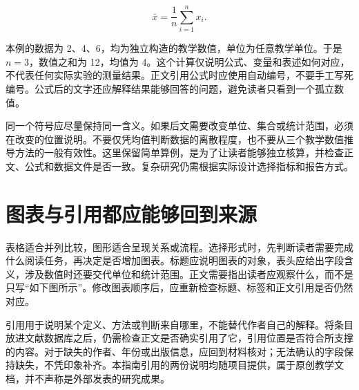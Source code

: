 \begin{equation}
\bar{x}=\frac{1}{n}\sum_{i=1}^{n}x_i.
\label{eq:mean}
\end{equation}

本例的数据为 2、4、6，均为独立构造的教学数值，单位为任意教学单位。于是 $n=3$，数值之和为 12，均值为 4。这个计算仅说明公式、变量和表述如何对应，不代表任何实际实验的测量结果。正文引用公式时应使用自动编号，不要手工写死编号。公式后的文字还应解释结果能够回答的问题，避免读者只看到一个孤立数值。

同一个符号应尽量保持同一含义。如果后文需要改变单位、集合或统计范围，必须在改变的位置说明。不要仅凭均值判断数据的离散程度，也不要从三个教学数值推导方法的一般有效性。这里保留简单算例，是为了让读者能够独立核算，并检查正文、公式和数据文件是否一致。复杂研究仍需根据实际设计选择指标和报告方式。

\section{图表与引用都应能够回到来源}

表格适合并列比较，图形适合呈现关系或流程。选择形式时，先判断读者需要完成什么阅读任务，再决定是否增加图表。标题应说明图表的对象，表头应给出字段含义，涉及数值时还要交代单位和统计范围。正文需要指出读者应观察什么，而不是只写“如下图所示”。修改图表顺序后，应重新检查标题、标签和正文引用是否仍然对应。

引用用于说明某个定义、方法或判断来自哪里，不能替代作者自己的解释。将条目放进文献数据库之后，仍需检查正文是否确实引用了它，引用位置是否符合所支撑的内容。对于缺失的作者、年份或出版信息，应回到材料核对；无法确认的字段保持缺失，不凭印象补齐。本指南引用的两份说明均随项目提供，属于原创教学文档，并不声称是外部发表的研究成果。
